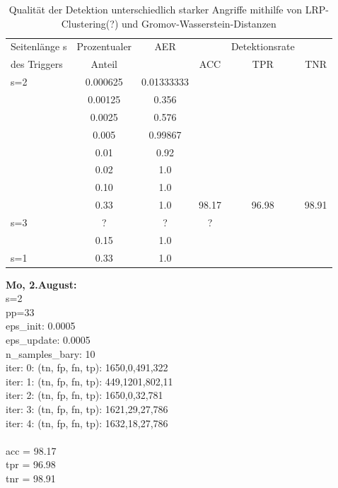 \documentclass[twoside, 11pt,a4paper]{article}
\numberwithin{equation}{section}
\begin{document}
	\begin{table}[ht]
		
		
		\begin{center}
			\begin{tabular}{|l|c|c|ccc|}
				\hline
				Seitenlänge s& Prozentualer & AER   & &Detektionsrate & \\
				des Triggers & Anteil& & ACC & TPR & TNR   \\\hline
				s=2 & 0.000625 & 0.01333333  & &&   \\
				& 0.00125 & 0.356  &  &&   \\
				& 0.0025 & 0.576 & &&   \\
				& 0.005 & 0.99867 & &&   \\
				& 0.01 & 0.92 & &&   \\
				& 0.02 & 1.0 & &&  \\ 
				& 0.10 & 1.0 & &&  \\ 
				& 0.33 & 1.0 & 98.17 & 96.98 & 98.91  \\ \hline
				s=3 & ? & ? & ?  && \\ 
				& 0.15 & 1.0 &  && \\ \hline
				s=1 & 0.33 & 1.0 &   && \\ \hline
			\end{tabular}
			\caption{Qualität der Detektion unterschiedlich starker Angriffe mithilfe von LRP-Clustering(?) und Gromov-Wasserstein-Distanzen}
			\label{tab:SPA_def_inv3_gwclustering}	
		\end{center}
	\end{table}
	\newpage
	\noindent \textbf{Mo, 2.August:}\\
	s=2\\
	pp=33\\
	eps\_init: 0.0005\\
	eps\_update: 0.0005\\
	n\_samples\_bary: 10\\
	iter: 0:	(tn, fp, fn, tp): 1650,0,491,322\\
	iter: 1:	(tn, fp, fn, tp): 449,1201,802,11\\
	iter: 2:	(tn, fp, fn, tp): 1650,0,32,781\\
	iter: 3:	(tn, fp, fn, tp): 1621,29,27,786\\
	iter: 4:	(tn, fp, fn, tp): 1632,18,27,786\\
	\\
	acc = 98.17\\
	tpr = 96.98\\
	tnr = 98.91\\
	
\end{document}
